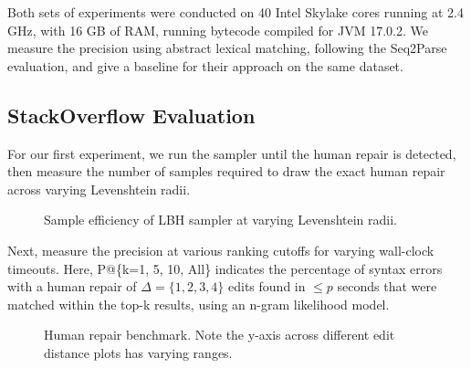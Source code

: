 \documentclass[sigplan,review,anonymous,acmsmall]{acmart}\settopmatter{printfolios=false,printccs=false,printacmref=false}
\begin{document}
  Both sets of experiments were conducted on 40 Intel Skylake cores running at 2.4 GHz, with 16 GB of RAM, running bytecode compiled for JVM 17.0.2. We measure the precision using abstract lexical matching, following the Seq2Parse~\cite{sakkas2022seq2parse} evaluation, and give a baseline for their approach on the same dataset.

  \subsection{StackOverflow Evaluation}

  For our first experiment, we run the sampler until the human repair is detected, then measure the number of samples required to draw the exact human repair across varying Levenshtein radii.

  \begin{figure}[h!]
%  
    \caption{Sample efficiency of LBH sampler at varying Levenshtein radii.}\label{fig:sample_efficiency}
  \end{figure}

  Next, measure the precision at various ranking cutoffs for varying wall-clock timeouts. Here, P@\{k=1, 5, 10, All\} indicates the percentage of syntax errors with a human repair of $\Delta=\{1, 2, 3, 4\}$ edits found in $\leq p$ seconds that were matched within the top-k results, using an n-gram likelihood model.

  \begin{figure}[h!]
    \resizebox{.24\textwidth}{!}{}
    \resizebox{.24\textwidth}{!}{}
    \resizebox{.24\textwidth}{!}{}
    \resizebox{.24\textwidth}{!}{}
    \caption{Human repair benchmark. Note the y-axis across different edit distance plots has varying ranges.}\label{fig:human}
  \end{figure}

\end{document}
